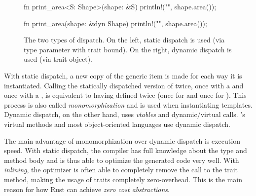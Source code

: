 \begin{figure}[b]
  \centering
    \begin{minipage}[t]{.49\textwidth}
    \begin{rustcode}
      fn print_area<S: Shape>(shape: &S) {
          println!("{}", shape.area());
      }
    \end{rustcode}
  \end{minipage}
  \begin{minipage}[t]{.49\textwidth}
    \begin{rustcode}
      fn print_area(shape: &dyn Shape) {
          println!("{}", shape.area());
      }
    \end{rustcode}
  \end{minipage}
  \caption{
    The two types of dispatch.
    On the left, static dispatch is used (via type parameter with trait bound).
    On the right, dynamic dispatch is used (via trait object).
  }
  \label{fig:dispatch}
\end{figure}

With static dispatch, a new copy of the generic item is made for each way it is instantiated.
Calling the statically dispatched version of  twice, once with a  and once with a , is equivalent to having defined  twice (once for  and once for ).
This process is also called \emph{monomorphization} and is used when instantiating \cpp templates.
Dynamic dispatch, on the other hand, uses \emph{vtables} and dynamic/virtual calls.
\cpp's virtual methods and most object-oriented languages use dynamic dispatch.

The main advantage of monomorphization over dynamic dispatch is execution speed.
With static dispatch, the compiler has full knowledge about the type and method body and is thus able to optimize the generated code very well.
With \emph{inlining}, the optimizer is often able to completely remove the call to the trait method, making the usage of traits completely zero-overhead.
This is the main reason for how Rust can achieve \emph{zero cost abstractions}.

